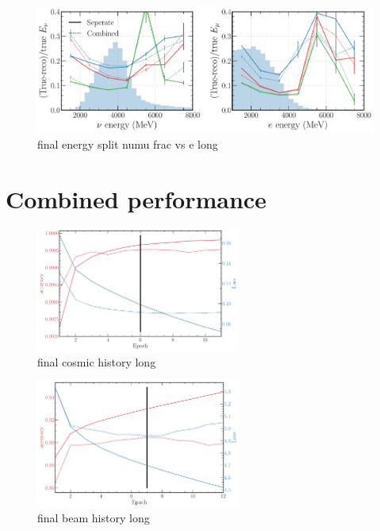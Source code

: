 \begin{figure} %
    \includegraphics[width=\textwidth]{diagrams/7-cvn/chipsnet/final_energy_split_numu_frac_vs_e.pdf}
    \caption[final energy split numu frac vs e short]
    {final energy split numu frac vs e long}
    \label{fig:final_energy_split_numu_frac_vs_e}
\end{figure}

\section{Combined performance} %
\label{sec:cvn_final} %

\begin{figure} %
    \includegraphics[width=0.6\textwidth]{diagrams/7-cvn/chipsnet/final_cosmic_history.pdf}
    \caption[final cosmic history short]
    {final cosmic history long}
    \label{fig:final_cosmic_history}
\end{figure}

\begin{figure} %
    \includegraphics[width=0.6\textwidth]{diagrams/7-cvn/chipsnet/final_beam_history.pdf}
    \caption[final beam history short]
    {final beam history long}
    \label{fig:final_beam_history}
\end{figure}

